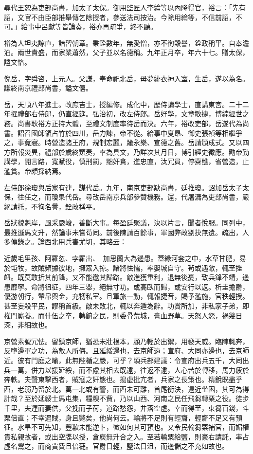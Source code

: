 \begin{pinyinscope}
尋代王恕為吏部尚書，加太子太保。御用監匠人李綸等以內降得官，裕言：「先有詔，文官不由臣部推舉傳乞除授者，參送法司按治。今除用綸等，不信前詔，不可。」給事中呂獻等皆論奏，裕亦再疏爭，終不聽。

裕為人坦夷諒直，諳習朝章。秉銓數年，無愛憎，亦不徇毀譽，銓政稱平。自奉澹泊。兩世貴盛，而家業蕭然，父子並以名德稱。九年正月卒，年六十七。贈太保，謚文恪。

倪岳，字舜咨，上元人。父謙，奉命祀北岳，母夢緋衣神入室，生岳，遂以為名。謙終南京禮部尚書，謚文僖。

岳，天順八年進士。改庶吉士，授編修。成化中，歷侍讀學士，直講東宮。二十二年擢禮部右侍郎，仍直經筵。弘治初，改左侍郎。岳好學，文章敏捷，博綜經世之務。尚書耿裕方正持大體，至禮文制度率待岳而決。六年，裕改吏部，岳遂代為尚書。詔召國師領占竹於四川，岳力諫，帝不從。給事中夏昂、御史張禎等相繼爭之，事竟寢。時營造諸王府，規制宏麗，踰永樂、宣德之舊。岳請頒成式。又以四方所報災異，禮部於歲終類奏，率為具文，乃詳次其月日，博引經史徵應。勸帝勤講學，開言路，寬賦役，慎刑罰，黜奸貪，進忠直，汰冗員，停齋醮，省營造，止濫賞。帝頗採納焉。

左侍郎徐瓊與后家有連，謀代岳。九年，南京吏部缺尚書，廷推瓊。詔加岳太子太保，往任之，而瓊果代岳。尋改岳南京兵部參贊機務。還，代屠滽為吏部尚書，嚴絕請托，不徇名譽，銓政稱平。

岳狀貌魁岸，風采嚴峻，善斷大事。每盈廷聚議，決以片言，聞者悅服。同列中，最推遜馬文升，然論事未嘗茍同。前後陳請百餘事，軍國弊政剔抉無遺。疏出，人多傳錄之。論西北用兵害尤切，其略云：

近歲毛里孩、阿羅忽、孛羅出、加思蘭大為邊患。蓋緣河套之中，水草甘肥，易於屯牧，故賊頻據彼地，擁眾入掠。諸將怯懦，率嬰城自守。茍或遇敵，輒至挫衄。既莫敢折其前鋒，又不能邀其歸路。敵進獲重利，退無後憂，致兵鋒不靖，邊患靡寧。命將徂征，四年三舉，絕無寸功。或高臥而歸，或安行以返。析圭擔爵，優游朝行，輦帛輿金，充牣私室。且軍旅一動，輒報捷音，賜予濫施，官秩輕授。甚至妄殺平民，謬稱首級。敵未敗北，輒以奔遁為辭。功賞所加，非私家子弟，即權門廝養。而什伍之卒，轉餉之民，則委骨荒城，膏血野草。天怒人怨，禍幾日深，非細故也。

京營素號冗怯。留鎮京師，猶恐未壯根本，顧乃輕於出禦，用褻天威。臨陣輒奔，反墮邊軍之功，為敵人所侮。且延綏邊也，去京師遠；宣府、大同亦邊也，去京師近。彼有門庭之喻，此無陛楯之嚴，可乎？頃兵部建議：令宣府出兵五千，大同出兵一萬，併力以援延綏，而不慮其相去既遠，往返不逮，人心苦於轉移，馬力疲於奔軼。夫聲東擊西者，賊寇之奸態也。搗虛批亢者，兵家之長策也。精銳既盡乎西，老弱乃留於北。萬一北或有警，而西未可離，首尾衡決，遠近坐困，其可為得計哉？至於延綏士馬屯集，糧糗不貲，乃以山西、河南之民任飛芻轉粟之役。徒步千里，夫運而妻供，父挽而子荷，道路愁怨，井落空虛。幸而得至，束芻百錢，斗粟倍直；不幸遇賊，身且斃矣，他尚何云。輸將不足則有輕齎，輕齎不足又有預征。水旱不可先知，豐歉未能逆卜，徵如何其可預也。又令民輸芻粟補官，而媚權貴私親故者，或出空牒以授，倉庾無升合之入。至若輸粟給鹽，則豪右請託，率占虛名鬻之，而商賈費且倍蓰。官爵日輕，鹽法日沮，而邊儲之不充如故也。


\end{pinyinscope}
